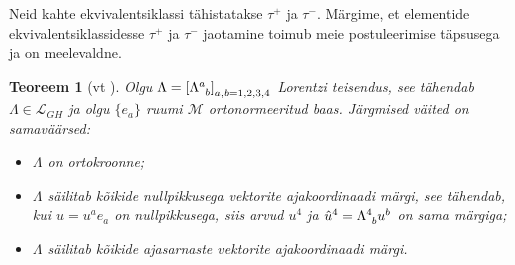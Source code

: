 \documentclass[12pt,a4paper,oneside]{article}
\theoremstyle{plain}
\newtheorem{teoreem}{Teoreem}[section]
\theoremstyle{definition}
\numberwithin{equation}{section}
\def\L{{\mathcal L}}
\def\M{{\mathcal M}}
\begin{document}
Neid kahte ekvivalentsiklassi tähistatakse $\tau^+$ ja $\tau^-$. 
Märgime, et elementide ekvivalentsiklassidesse $\tau^+$ ja $\tau^-$ 
jaotamine toimub meie postuleerimise täpsusega ja on meelevaldne.

\begin{teoreem}[vt \textnormal{\cite[teoreem 1.3.3]{Naber}}]
Olgu $\Lambda = \left[\Lambda\indices{^a_b}\right]_{a,b = 1,2,3,4}$ 
Lorentzi teisendus, see tähendab $\Lambda \in \L_{GH}$ ja olgu 
$\{e_a\}$ ruumi $\M$ orto\-normeeritud baas. Järgmised 
väited on samaväärsed:
\begin{itemize}
\item[\emph{(i)}] $\Lambda$ on ortokroonne;
\item[\emph{(ii)}] $\Lambda$ säilitab kõikide nullpikkusega vektorite 
ajakoordinaadi märgi, see tähendab, kui $u = u^a e_a$ on 
nullpikkusega, siis arvud $u^4$ ja $\hat{u}^4 = 
\Lambda\indices{^4_b} u^b$ on sama märgiga;
\item[\emph{(iii)}] $\Lambda$ säilitab kõikide ajasarnaste vektorite 
ajakoordinaadi märgi.
\end{itemize}
\end{teoreem}
\end{document}
